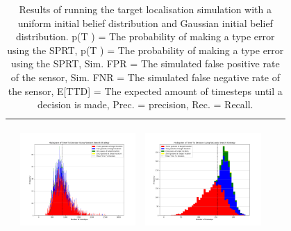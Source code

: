 \begin{landscape}
\begin{table}[h!]
\begin{tabular}{ | c | c | c | c | c |}
\begin{minipage}[c][45mm][c]{45mm}
    \end{minipage}
    &
    \begin{minipage}[c][45mm][c]{45mm}
      \includegraphics[width=44mm, height=44mm]{Chapters/MultiAgentTargetDetection/Figs/Histograms/MultipleAgent/3/3RandomHistogram.png}
    \end{minipage}
    &
    \begin{minipage}[c][45mm][c]{45mm}
      \includegraphics[width=44mm, height=44mm]{Chapters/MultiAgentTargetDetection/Figs/Histograms/MultipleAgent/3/3SaccadicHistogram.png}
    \end{minipage}
    \\
    \hline
   
  \end{tabular}
  \caption{Results of running the target localisation simulation with a  uniform initial belief distribution and Gaussian initial belief distribution. p(T ) = The probability of making a type  error using the SPRT, p(T ) = The probability of making a type  error using the SPRT, Sim. FPR = The simulated false positive rate of the sensor, Sim. FNR = The simulated false negative rate of the sensor, E[TTD] = The expected amount of timesteps until a decision is made, Prec. = precision, Rec. = Recall. }\label{table:ORToolsResults}
\end{table}


\end{landscape}
